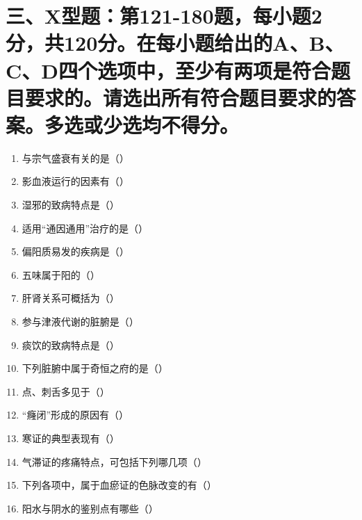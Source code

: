 \documentclass[a4paper,11pt]{ctexart}
\begin{document}
\section*{\large 三、X型题：第121-180题，每小题2分，共120分。在每小题给出的A、B、C、D四个选项中，至少有两项是符合题目要求的。请选出所有符合题目要求的答案。多选或少选均不得分。}

\begin{enumerate}[resume]
      \item 与宗气盛衰有关的是（\quad）
      \item 影血液运行的因素有（\quad）
      \item 湿邪的致病特点是（\quad）
      \item 适用“通因通用”治疗的是（\quad）
      \item 偏阳质易发的疾病是（\quad）
      \item 五味属于阳的（\quad）
      \item 肝肾关系可概括为（\quad）
      \item 参与津液代谢的脏腑是（\quad）
      \item 痰饮的致病特点是（\quad）
      \item 下列脏腑中属于奇恒之府的是（\quad）
      \item 点、刺舌多见于（\quad）
      \item “癃闭”形成的原因有（\quad）
      \item 寒证的典型表现有（\quad）
      \item 气滞证的疼痛特点，可包括下列哪几项（\quad）
      \item 下列各项中，属于血瘀证的色脉改变的有（\quad）
      \item 阳水与阴水的鉴别点有哪些（\quad）

\end{enumerate}
\end{document}

